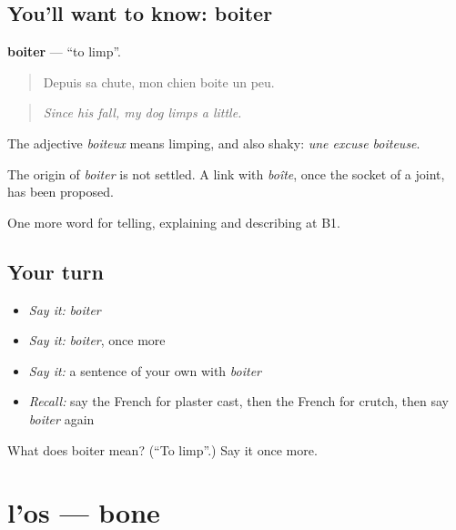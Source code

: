 \subsection*{You'll want to know: boiter}
\textbf{boiter} — \textquotedblleft{}to limp\textquotedblright{}.

\begin{quote}
Depuis sa chute, mon chien boite un peu.
\end{quote}

\begin{quote}
\emph{Since his fall, my dog limps a little.}
\end{quote}

The adjective \emph{boiteux} means limping, and also shaky: \emph{une excuse boiteuse}.

\begin{cousinweb}
The origin of \emph{boiter} is not settled. A link with \emph{boîte}, once the socket of a joint, has been proposed.
\end{cousinweb}

\begin{grammarlens}[title={What you've built}]
One more word for telling, explaining and describing at B1.
\end{grammarlens}

\subsection*{Your turn}
\begin{itemize}
\raggedright
  \item \emph{Say it:} \emph{boiter}
  \item \emph{Say it:} \emph{boiter}, once more
  \item \emph{Say it:} a sentence of your own with \emph{boiter}
  \item \emph{Recall:} say the French for plaster cast, then the French for crutch, then say \emph{boiter} again
\end{itemize}

\begin{tcolorbox}[breakable,colback=teal!4,colframe=teal!35!black,title={Before you move on}]
What does boiter mean? (\textquotedblleft{}To limp\textquotedblright{}.) Say it once more.
\end{tcolorbox}
\section[l'os]{l'os — bone}

